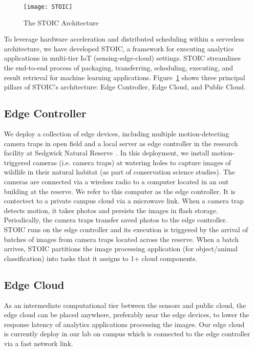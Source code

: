 \begin{figure}
    \centering
    \texttt{[image: STOIC]}
    \caption{The STOIC Architecture \label{fig:STOIC}}
\end{figure}

To leverage hardware acceleration and distributed scheduling within a serverless architecture, we have developed STOIC, a framework for executing analytics applications in multi-tier IoT (sensing-edge-cloud) settings. STOIC streamlines the end-to-end process of packaging, transferring, scheduling, executing, and result retrieval for machine learning applications. Figure~\ref{fig:STOIC} shows three principal pillars of STOIC's architecture: Edge Controller, Edge Cloud, and Public Cloud.

\subsection{Edge Controller}
 We deploy a collection of edge devices, including multiple motion-detecting camera traps in open field and a local server as edge controller in the research facility at Sedgwick Natural Reserve~\cite{ref:sedgwick}. 
In this deployment, we install motion-triggered cameras (i.e. camera traps) at 
watering holes to capture images of wildlife in their natural habitat (as part of conservation science studies). The cameras are connected via a wireless
radio to a computer located in an out building at the reserve.  
We refer to this computer as the edge controller.  It is contectect to 
a private campus cloud via a microwave link.
When a camera trap detects motion, it takes photos and persists the images in
flash storage. Periodically, the camera traps transfer saved photos to the edge controller. STOIC runs on the edge controller and its execution is
triggered by the arrival of batches of images from camera traps located
across the reserve. When a batch arrives, STOIC partitions the image processing
application (for object/animal classification) into tasks that it assigns
to 1+ cloud components.
 
 \subsection{Edge Cloud}
 
As an intermediate computational tier between the sensors and public cloud, the edge cloud can be placed anywhere, preferably near the edge devices, to lower the response latency of analytics applications processing the images. Our edge cloud is currently deploy in our lab on campus which is connected to the edge controller via a fast network link.

